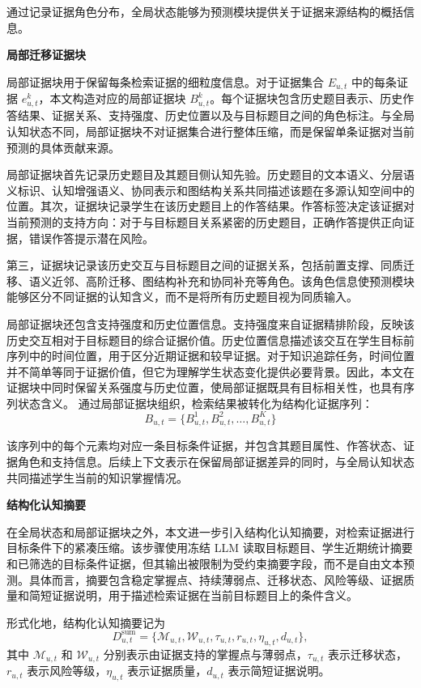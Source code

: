 \documentclass[UTF8,a4paper,12pt]{ctexart}
\numberwithin{table}{section}
\begin{document}
通过记录证据角色分布，全局状态能够为预测模块提供关于证据来源结构的概括信息。

\noindent\textbf{局部迁移证据块}

局部证据块用于保留每条检索证据的细粒度信息。对于证据集合 \(E_{u,t}\) 中的每条证据 \(e_{u,t}^{k}\)，本文构造对应的局部证据块 \(B_{u,t}^{k}\)。每个证据块包含历史题目表示、历史作答结果、证据关系、支持强度、历史位置以及与目标题目之间的角色标注。与全局认知状态不同，局部证据块不对证据集合进行整体压缩，而是保留单条证据对当前预测的具体贡献来源。

局部证据块首先记录历史题目及其题目侧认知先验。历史题目的文本语义、分层语义标识、认知增强语义、协同表示和图结构关系共同描述该题在多源认知空间中的位置。其次，证据块记录学生在该历史题目上的作答结果。作答标签决定该证据对当前预测的支持方向：对于与目标题目关系紧密的历史题目，正确作答提供正向证据，错误作答提示潜在风险。

第三，证据块记录该历史交互与目标题目之间的证据关系，包括前置支撑、同质迁移、语义近邻、高阶迁移、图结构补充和协同补充等角色。该角色信息使预测模块能够区分不同证据的认知含义，而不是将所有历史题目视为同质输入。

局部证据块还包含支持强度和历史位置信息。支持强度来自证据精排阶段，反映该历史交互相对于目标题目的综合证据价值。历史位置信息描述该交互在学生目标前序列中的时间位置，用于区分近期证据和较早证据。对于知识追踪任务，时间位置并不简单等同于证据价值，但它为理解学生状态变化提供必要背景。因此，本文在证据块中同时保留关系强度与历史位置，使局部证据既具有目标相关性，也具有序列状态含义。
通过局部证据块组织，检索结果被转化为结构化证据序列：
\[
B_{u,t}=\{B_{u,t}^{1},B_{u,t}^{2},\ldots,B_{u,t}^{K}\}
\]

该序列中的每个元素均对应一条目标条件证据，并包含其题目属性、作答状态、证据角色和支持信息。后续上下文表示在保留局部证据差异的同时，与全局认知状态共同描述学生当前的知识掌握情况。

\noindent\textbf{结构化认知摘要}

在全局状态和局部证据块之外，本文进一步引入结构化认知摘要，对检索证据进行目标条件下的紧凑压缩。该步骤使用冻结 LLM 读取目标题目、学生近期统计摘要和已筛选的目标条件证据，但其输出被限制为受约束摘要字段，而不是自由文本预测。具体而言，摘要包含稳定掌握点、持续薄弱点、迁移状态、风险等级、证据质量和简短证据说明，用于描述检索证据在当前目标题目上的条件含义。

形式化地，结构化认知摘要记为
\[
D^{\mathrm{sum}}_{u,t}=\{\mathcal M_{u,t},\mathcal W_{u,t},\tau_{u,t},r_{u,t},\eta_{u,t},d_{u,t}\},
\]
其中 \(\mathcal M_{u,t}\) 和 \(\mathcal W_{u,t}\) 分别表示由证据支持的掌握点与薄弱点，\(\tau_{u,t}\) 表示迁移状态，\(r_{u,t}\) 表示风险等级，\(\eta_{u,t}\) 表示证据质量，\(d_{u,t}\) 表示简短证据说明。
\end{document}
